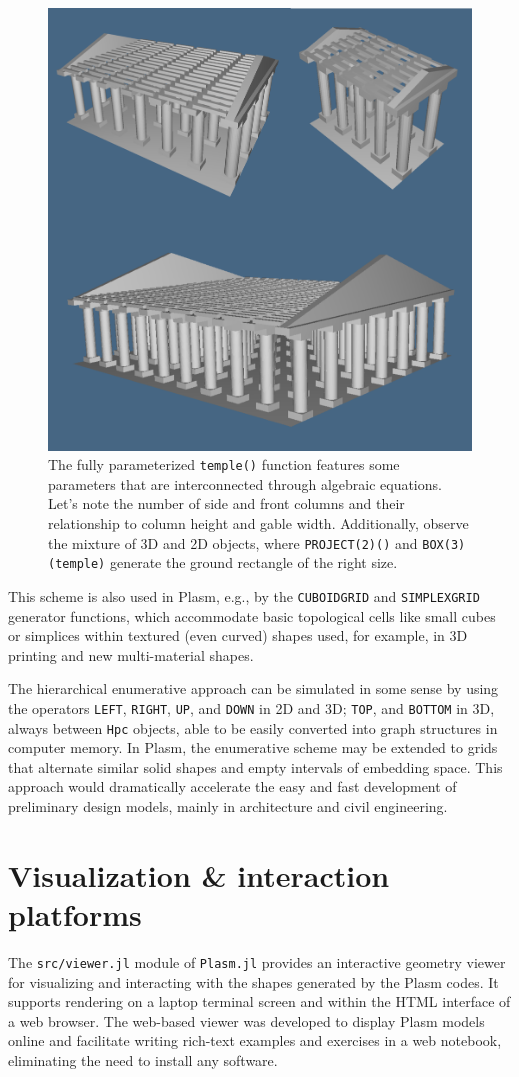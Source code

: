 \documentclass{juliacon}
\begin{document}
\begin{figure}
\centering
	\includegraphics[width=0.5\linewidth]{figs/temples}
	\caption{The fully parameterized {\tt temple()} function features some parameters that are interconnected through algebraic equations. Let’s note the number of side and front columns and their relationship to column height and gable width. Additionally, observe the mixture of 3D and 2D objects, where {\tt PROJECT(2)()} and {\tt BOX(3)(temple)} generate the ground rectangle of the right size.}
	\label{fig:5:temples}
\end{figure}

This scheme is also used in Plasm, e.g., by the {\tt CUBOIDGRID} and {\tt SIMPLEXGRID} generator functions, which accommodate basic topological cells like small cubes or simplices within textured (even curved) shapes used, for example, in 3D printing and new multi-material shapes.

The hierarchical enumerative approach can be simulated in some sense by using the operators {\tt LEFT}, {\tt RIGHT}, {\tt UP}, and {\tt DOWN} in 2D and 3D; {\tt TOP}, and {\tt BOTTOM} in 3D, always between {\tt Hpc} objects, able to be easily converted into graph structures in computer memory. In Plasm, the enumerative scheme may be extended to grids that alternate similar solid shapes and empty intervals of embedding space. This approach would dramatically accelerate the easy and fast development of preliminary design models, mainly in architecture and civil engineering.


\section{Visualization \& interaction platforms}
\label{sec:additional_doc}

The {\tt src/viewer.jl} module of {\tt Plasm.jl} provides an interactive geometry viewer for visualizing and interacting with the shapes generated by the Plasm codes. It supports rendering on a laptop terminal screen and within the HTML interface of a web browser. The web-based viewer was developed to display Plasm models online and facilitate writing rich-text examples and exercises in a web notebook, eliminating the need to install any software.
\end{document}
